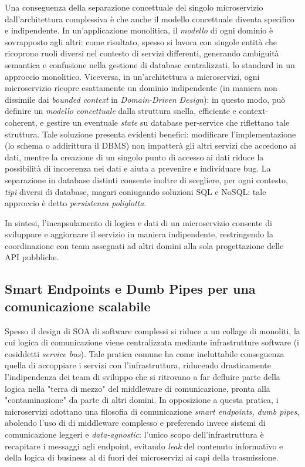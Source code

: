 Una conseguenza della separazione concettuale del singolo microservizio dall'architettura complessiva è che anche il modello concettuale diventa specifico e indipendente. In un'applicazione monolitica, il \emph{modello} di ogni dominio è sovrapposto agli altri: come risultato, spesso si lavora con singole entità che ricoprono ruoli diversi nel contesto di servizi differenti, generando ambiguità semantica e confusione nella gestione di database centralizzati, lo standard in un approccio monolitico.
Viceversa, in un'architettura a microservizi, ogni microservizio ricopre esattamente un dominio indipendente (in maniera non dissimile dai \emph{bounded context} in \emph{Domain-Driven Design}): in questo modo, può definire un \emph{modello concettuale} dalla struttura snella, efficiente e context-coherent, e gestire un eventuale \emph{state} su database per-service che riflettano tale struttura.
Tale soluzione presenta evidenti benefici: modificare l'implementazione (lo schema o addirittura il DBMS) non impatterà gli altri servizi che accedono ai dati, mentre la creazione di un singolo punto di accesso ai dati riduce la possibilità di incoerenza nei dati e aiuta a prevenire e individuare bug.
La separazione in database distinti consente inoltre di scegliere, per ogni contesto, \emph{tipi} diversi di database, magari coniugando soluzioni SQL e NoSQL: tale approccio è detto \emph{persistenza poliglotta}\cite[29]{.NET_Microservices}.

In sintesi, l'incapsulamento di logica e dati di un microservizio consente di sviluppare e aggiornare il servizio in maniera indipendente, restringendo la coordinazione con team assegnati ad altri domini alla sola progettazione delle API pubbliche.

\subsection{Smart Endpoints e Dumb Pipes per una comunicazione scalabile}
Spesso il design di SOA di software complessi si riduce a un collage di monoliti, la cui logica di comunicazione viene centralizzata mediante infrastrutture software (i cosiddetti \emph{service bus}). Tale pratica comune ha come ineluttabile conseguenza quella di accoppiare i servizi con l'infrastruttura, riducendo drasticamente l'indipendenza dei team di sviluppo che si ritrovano a far defluire parte della logica nella "terra di mezzo" del middleware di comunicazione, pronta alla "contaminazione" da parte di altri domini.
In opposizione a questa pratica, i microservizi adottano una filosofia di comunicazione \emph{smart endpoints, dumb pipes}\cite[19]{Thesis_microservices}, abolendo l'uso di di middleware complesso e preferendo invece sistemi di comunicazione leggeri e \emph{data-agnostic}: l'unico scopo dell'infrastruttura è recapitare i messaggi agli endpoint, evitando \emph{leak} del contenuto informativo e della logica di business al di fuori dei microservizi ai capi della trasmissione.

